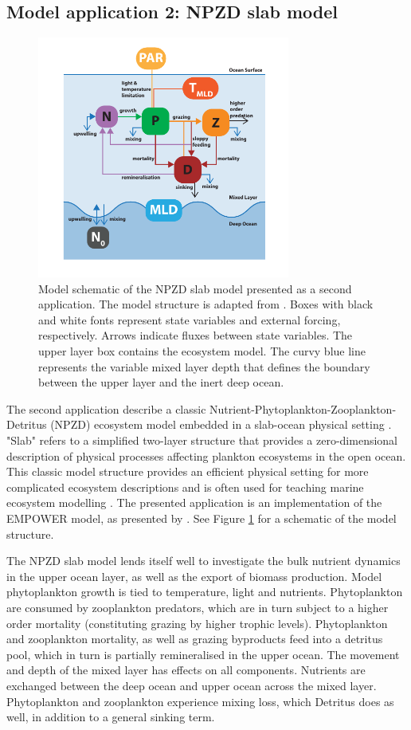 \documentclass[journal abbreviation, manuscript]{copernicus}
\begin{document}
\subsection{Model application 2: NPZD slab model}
\begin{figure}[t]
\includegraphics[width=8.3cm]{Figures/firstdraft_schematics/02_schematics_EMPOWER.pdf}
\caption{Model schematic of the NPZD slab model presented as a second application. The model structure is adapted
from \citet{Anderson2015c}. Boxes with black and white fonts represent state variables and external forcing, respectively. Arrows indicate fluxes between state variables. The upper layer box contains the ecosystem model. The curvy blue line represents the variable mixed layer depth that defines the boundary between the upper layer and the inert deep ocean. }
\label{Figure:ModelSchematics_2}
\end{figure}

The second application describe a classic Nutrient-Phytoplankton-Zooplankton-Detritus (NPZD) ecosystem model embedded in a slab-ocean physical setting \citep[e.g.,][]{Evans1985ACycles, Fasham1990a}. "Slab" refers to a simplified two-layer structure that provides a zero-dimensional description of physical processes affecting plankton ecosystems in the open ocean. This classic model structure provides an efficient physical setting for more complicated ecosystem descriptions and is often used for teaching marine ecosystem modelling \citep{Anderson2015c}. The presented application is an implementation of the EMPOWER model, as presented by \citet{Anderson2015c}. See Figure \ref{Figure:ModelSchematics_2} for a schematic of the model structure.


The NPZD slab model lends itself well to investigate the bulk nutrient dynamics in the upper ocean layer, as well as the export of biomass production. Model phytoplankton growth is tied to temperature, light and nutrients. Phytoplankton are consumed by zooplankton predators, which are in turn subject to a higher order mortality (constituting grazing by higher trophic levels). Phytoplankton and zooplankton mortality, as well as grazing byproducts feed into a detritus pool, which in turn is partially remineralised in the upper ocean. The movement and depth of the mixed layer has effects on all components. Nutrients are exchanged between the deep ocean and upper ocean across the mixed layer. Phytoplankton and zooplankton experience mixing loss, which Detritus does as well, in addition to a general sinking term.
\end{document}
